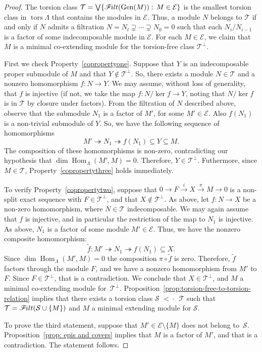 \documentclass[ALCO,ThmDefs,Unicode,epreuves]{cedram}
\DeclareMathOperator{\tors}{tors}
\DeclareMathOperator{\Hom}{Hom}
\newcommand{\calE}{\mathcal{E}}
\newcommand{\calS}{\mathcal{S}}
\newcommand{\calT}{\mathcal{T}}
\newcommand{\onto}{\twoheadrightarrow}
\newcommand{\filt}{\mathscr{F}\Mk ilt}
\newcommand{\covered}{{\,\,<\!\!\!\!\cdot\,\,\,}}
\renewcommand{\Join}{\bigvee}
\newcommand{\Gen}{\operatorname{Gen}}
\renewcommand{\1}{\hat{1}}
\newcommand{\0}{\hat{0}}
\newcommand*{\Mk}{\mkern -2mu}
\begin{document}
\begin{proof}
The torsion class $\calT=\Join \{\filt(\Gen(M)):\, M\in \calE\}$ is the smallest torsion class in $\tors \Lambda$ that contains the modules in $\calE$.
Thus, a module $N$ belongs to $\calT$ if and only if $N$ admits a filtration $N=N_l \supsetneq \cdots
 \supsetneq N_0=0$ such that each $N_i/N_{i-1}$ is a factor of some indecomposable module in $\calE$.
For each $M\in \calE$, we claim that $M$ is a minimal co-extending module for the torsion-free class $\calT^\perp$.

First we check Property~\ref{copropertyone}.
Suppose that $Y$ is an indecomposable proper submodule of $M$ and that $Y\notin \calT^\perp$.
So, there exists a module $N\in \calT$ and a nonzero homomorphism $f: N\rightarrow Y$.
We may assume, without loss of generality, that $f$ is injective (if not, we take the map $f:N/\ker f\rightarrow Y$, noting that $N/\ker f$ is in $\calT$ by closure under factors).
From the filtration of $N$ described above, observe that the submodule $N_1$ is a factor of $M'$, for some $M'\in \calE$.
Also $f(N_1)$ is a non-trivial submodule of $Y$.
So, we have the following sequence of homomorphisms \[ M' \onto N_1 \onto f(N_1) \subseteq Y\subseteq M.\]
The composition of these homomorphisms is non-zero, contradicting our hypothesis that $\dim \Hom_\Lambda (M', M) = 0$.
Therefore, $Y\in \calT^\perp$.
Futhermore, since $M\in \calT$, Property~\ref{copropertythree} holds immediately.

To verify Property~\ref{copropertytwo}, suppose that $0 \rightarrow F \xrightarrow{i} X \xrightarrow{\pi} M \rightarrow 0$ is a non-split exact sequence with $F\in \calT^\perp$, and that $X\notin \calT^\perp$.
As above, let $f: N\rightarrow X$ be a non-zero homomorphism, where $N\in \calT$ indecomposable.
We may again assume that $f$ is injective, and in particular the restriction of the map to $N_1$ is injective.
As above, $N_1$ is a factor of some module $M'\in\calE$.
Thus, we have the nonzero composite homomorphism:
\[\tilde{f}: M' \onto N_1 \onto f(N_1) \subseteq X.\]
Since $\dim \Hom_{\Lambda}(M', M) =0$ the composition $\pi\circ \tilde{f}$ is zero.
Therefore, $\tilde{f}$ factors through the module $F$, and we have a nonzero homomorphism from $M'$ to $F$.
Since $F\in \calT^\perp$, that is a contradiction.
We conclude that $X\in \calT^\perp$, and $M$ a minimal co-extending module for~$\calT^\perp$.
Proposition~\ref{prop:torsion-free-to-torsion-relation} implies that there exists a torsion class $\calS\covered \calT$ such that $\calT= \filt(\calS \cup \{M\})$ and $M$ a minimal extending module for $\calS$.

To prove the third statement, suppose that $M'\in \calE\setminus \{M\}$ does not belong to~$\calS$.
Proposition~\ref{prop: epis and covers} implies that $M$ is a factor of $M'$, and that is a contradiction.
The statement follows.
\end{proof}
\end{document}
